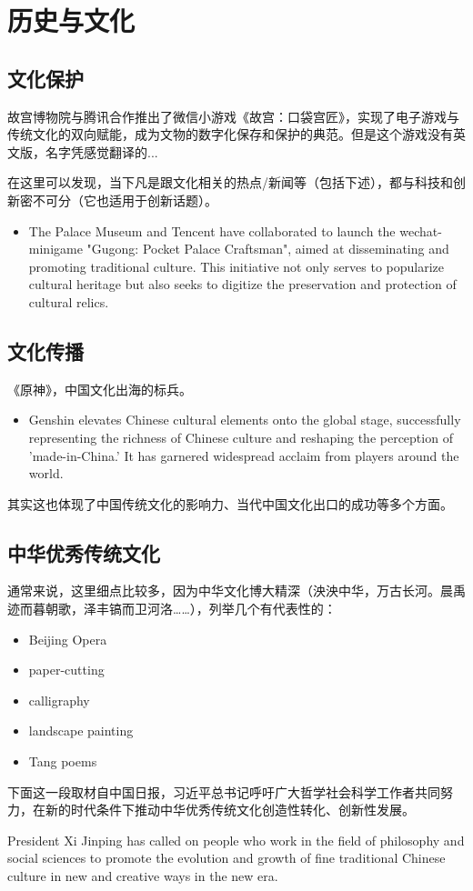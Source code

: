 \section{历史与文化}
\subsection{文化保护}
故宫博物院与腾讯合作推出了微信小游戏《故宫：口袋宫匠》，实现了电子游戏与传统文化的双向赋能，成为文物的数字化保存和保护的典范。但是这个游戏没有英文版，名字凭感觉翻译的...
\par
在这里可以发现，当下凡是跟文化相关的热点/新闻等（包括下述），都与科技和创新密不可分（它也适用于创新话题）。
\begin{itemize}
    \item The Palace Museum and Tencent have collaborated to launch the wechat-minigame "Gugong: Pocket Palace Craftsman", aimed at disseminating and promoting traditional culture. This initiative not only serves to popularize cultural heritage but also seeks to digitize the preservation and protection of cultural relics. 
\end{itemize}

\subsection{文化传播}
《原神》，中国文化出海的标兵。
\begin{itemize}
    \item  Genshin elevates Chinese cultural elements onto the global stage, successfully representing the richness of Chinese culture and reshaping the perception of 'made-in-China.' It has garnered widespread acclaim from players around the world.
\end{itemize}
\par
其实这也体现了中国传统文化的影响力、当代中国文化出口的成功等多个方面。
\subsection{中华优秀传统文化}
通常来说，这里细点比较多，因为中华文化博大精深（泱泱中华，万古长河。晨禹迹而暮朝歌，泽丰镐而卫河洛……），列举几个有代表性的：
\begin{itemize}
    \item Beijing Opera
    \item paper-cutting
    \item calligraphy
    \item landscape painting
    \item Tang poems
\end{itemize}
\par
下面这一段取材自中国日报，习近平总书记呼吁广大哲学社会科学工作者共同努力，在新的时代条件下推动中华优秀传统文化创造性转化、创新性发展。
\par
President Xi Jinping has called on people who work in the field of philosophy and social sciences to promote the evolution and growth of fine traditional Chinese culture in new and creative ways in the new era.
